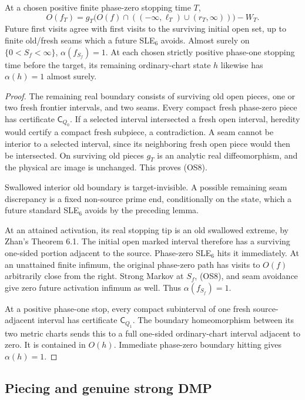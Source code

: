 \begin{lemma}
\label{lem:one-switch-marker-transport}
At a chosen positive finite phase-zero stopping time $T$,
\[
 O(f_T)=g_T\bigl(O(f)\cap
 ((-\infty,\ell_T)\cup(r_T,\infty))\bigr)-W_T.
 \tag{OS8}
\]
Future first visits agree with first visits to the surviving initial
open set, up to finite old/fresh seams which a future SLE$_6$
avoids. Almost surely on $\{0<S_f<\infty\}$,
$\alpha(f_{S_f})=1$. At each chosen strictly positive phase-one
stopping time before the target, its remaining ordinary-chart state
$h$ likewise has $\alpha(h)=1$ almost surely.
\end{lemma}
\begin{proof}
The remaining real boundary consists of surviving old open pieces,
one or two fresh frontier intervals, and two seams.
Every compact fresh phase-zero piece has certificate $\mathsf C_{Q_0}$.
If a selected interval intersected a fresh open interval, heredity
would certify a compact fresh subpiece, a contradiction.
A seam cannot be interior to a selected interval, since its
neighboring fresh open piece would then be intersected.
On surviving old pieces $g_T$ is an analytic real diffeomorphism,
and the physical arc image is unchanged. This proves (OS8).

Swallowed interior old boundary is target-invisible. A possible
remaining seam discrepancy is a fixed non-source prime end,
conditionally on the state, which a future standard SLE$_6$ avoids
by the preceding lemma.

At an attained activation, its real stopping tip is an old swallowed
extreme, by Zhan's Theorem 6.1. The initial open marked interval
therefore has a surviving one-sided portion adjacent to the source.
Phase-zero SLE$_6$ hits it immediately. At an unattained finite
infimum, the original phase-zero path has visits to $O(f)$
arbitrarily close from the right. Strong Markov at $S_f$, (OS8),
and seam avoidance give zero future activation infimum as well.
Thus $\alpha(f_{S_f})=1$.

At a positive phase-one stop, every compact subinterval of one
fresh source-adjacent interval has certificate $\mathsf C_{Q_1}$.
The boundary homeomorphism between its two metric charts sends
this to a full one-sided ordinary-chart interval adjacent to zero.
It is contained in $O(h)$. Immediate phase-zero boundary hitting
gives $\alpha(h)=1$.
\end{proof}

\subsection{Piecing and genuine strong DMP}

